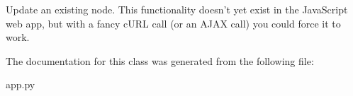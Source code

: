 \begin{DoxyVerb}Update an existing node. This functionality doesn't yet exist in the
JavaScript web app, but with a fancy cURL call (or an AJAX call) you
could force it to work.
\end{DoxyVerb}
 

The documentation for this class was generated from the following file\+:\begin{DoxyCompactItemize}
\item 
app.\+py\end{DoxyCompactItemize}
